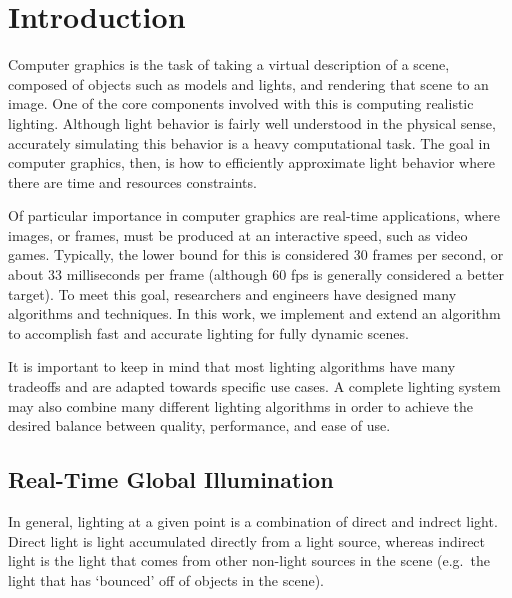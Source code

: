 \chapter{Introduction}
Computer graphics is the task of taking a virtual description of a scene, composed of objects such as models and lights, and rendering that scene to an image. One of the core components involved with this is computing realistic lighting. Although light behavior is fairly well understood in the physical sense, accurately simulating this behavior is a heavy computational task. The goal in computer graphics, then, is how to efficiently approximate light behavior where there are time and resources constraints.


Of particular importance in computer graphics are real-time applications, where images, or frames, must be produced at an interactive speed, such as video games. Typically, the lower bound for this is considered 30 frames per second, or about 33 milliseconds per frame (although 60 fps is generally considered a better target). To meet this goal, researchers and engineers have designed many algorithms and techniques.
In this work, we implement and extend an algorithm to accomplish fast and accurate lighting for fully dynamic scenes.

It is important to keep in mind that most lighting algorithms have many tradeoffs and are adapted towards specific use cases. A complete lighting system may also combine many different lighting algorithms in order to achieve the desired balance between quality, performance, and ease of use.

\section{Real-Time Global Illumination}
In general, lighting at a given point is a combination of direct and indrect light. Direct light is light accumulated directly from a light source, whereas indirect light is the light that comes from other non-light sources in the scene (e.g.\ the light that has `bounced' off of objects in the scene).

